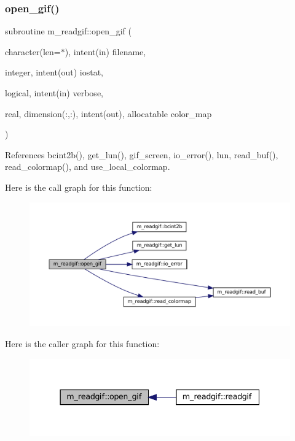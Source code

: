 \subsubsection{\texorpdfstring{open\+\_\+gif()}{open\_gif()}}
{\footnotesize\ttfamily subroutine m\+\_\+readgif\+::open\+\_\+gif (\begin{DoxyParamCaption}\item[{character(len=$\ast$), intent(in)}]{filename,  }\item[{integer, intent(out)}]{iostat,  }\item[{logical, intent(in)}]{verbose,  }\item[{real, dimension(\+:,\+:), intent(out), allocatable}]{color\+\_\+map }\end{DoxyParamCaption})\hspace{0.3cm}{\ttfamily [private]}}



References bcint2b(), get\+\_\+lun(), gif\+\_\+screen, io\+\_\+error(), lun, read\+\_\+buf(), read\+\_\+colormap(), and use\+\_\+local\+\_\+colormap.

Here is the call graph for this function\+:\nopagebreak
\begin{figure}[H]
\begin{center}
\leavevmode
\includegraphics[width=350pt]{namespacem__readgif_ae008e851af60f4d8fdeeb4fd96b8580d_cgraph}
\end{center}
\end{figure}
Here is the caller graph for this function\+:\nopagebreak
\begin{figure}[H]
\begin{center}
\leavevmode
\includegraphics[width=337pt]{namespacem__readgif_ae008e851af60f4d8fdeeb4fd96b8580d_icgraph}
\end{center}
\end{figure}
\mbox{\label{namespacem__readgif_a272a4dbcc1419d3d103db4c50b757805}} 
